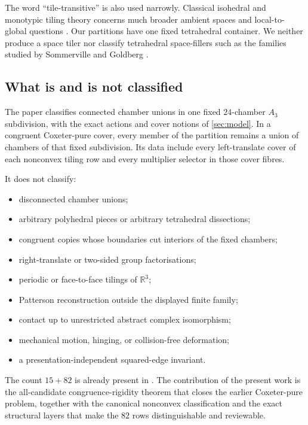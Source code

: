 The word ``tile-transitive'' is also used narrowly.  Classical isohedral and
monotypic tiling theory concerns much broader ambient spaces and local-to-
global questions \cite{GrunbaumShephard1977,DolbilinSchulte2004}.  Our
partitions have one fixed tetrahedral container.  We neither produce a space
tiler nor classify tetrahedral space-fillers such as the families studied by
Sommerville and Goldberg \cite{Sommerville1924,Goldberg1974}.

\subsection{What is and is not classified}

The paper classifies connected chamber unions in one fixed $24$-chamber
$A_3$ subdivision, with the exact actions and cover notions of
\cref{sec:model}.  In a congruent Coxeter-pure cover, every member of the
partition remains a union of chambers of that fixed subdivision.  Its data
include every left-translate cover of each nonconvex tiling row and every
multiplier selector in those cover fibres.

It does not classify:
\begin{itemize}[leftmargin=2em]
\item disconnected chamber unions;
\item arbitrary polyhedral pieces or arbitrary tetrahedral dissections;
\item congruent copies whose boundaries cut interiors of the fixed chambers;
\item right-translate or two-sided group factorisations;
\item periodic or face-to-face tilings of $\mathbb R^3$;
\item Patterson reconstruction outside the displayed finite family;
\item contact up to unrestricted abstract complex isomorphism;
\item mechanical motion, hinging, or collision-free deformation;
\item a presentation-independent squared-edge invariant.
\end{itemize}

The count $15+82$ is already present in \cite{BabanskyyT2}.  The contribution
of the present work is the all-candidate congruence-rigidity theorem that
closes the earlier Coxeter-pure problem, together with the canonical
nonconvex classification and the exact structural layers that make the $82$
rows distinguishable and reviewable.
